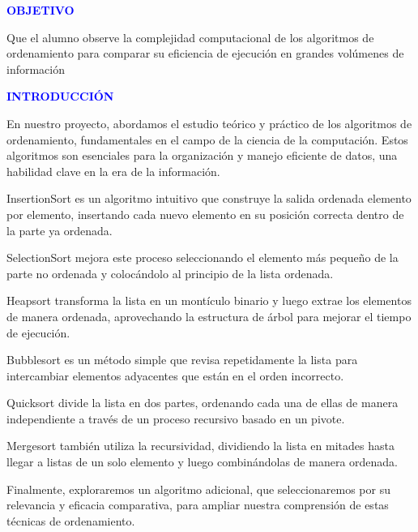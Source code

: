 \documentclass[12pt]{article}
\begin{document}
    \newpage
    \textcolor{blue}{\textbf{OBJETIVO}}
    \par\vspace{0.4cm}
    Que el alumno observe la complejidad computacional de los algoritmos de ordenamiento para 
    comparar su eficiencia de ejecución en grandes volúmenes de información
    \par\vspace{1.5cm}
    \textcolor{blue}{\textbf{INTRODUCCIÓN}}
    \par\vspace{0.4cm}
    En nuestro proyecto, abordamos el estudio teórico y práctico de los algoritmos de ordenamiento, fundamentales en el campo de la ciencia de la computación. Estos algoritmos son esenciales para la organización y manejo eficiente de datos, una habilidad clave en la era de la información.
    \par\vspace{0.4cm}
    InsertionSort es un algoritmo intuitivo que construye la salida ordenada elemento por elemento, insertando cada nuevo elemento en su posición correcta dentro de la parte ya ordenada.
    \par\vspace{0.4cm}
    SelectionSort mejora este proceso seleccionando el elemento más pequeño de la parte no ordenada y colocándolo al principio de la lista ordenada.
    \par\vspace{0.4cm}
    Heapsort transforma la lista en un montículo binario y luego extrae los elementos de manera ordenada, aprovechando la estructura de árbol para mejorar el tiempo de ejecución.
    \par\vspace{0.4cm}
    Bubblesort es un método simple que revisa repetidamente la lista para intercambiar elementos adyacentes que están en el orden incorrecto.
    \par\vspace{0.4cm}
    Quicksort divide la lista en dos partes, ordenando cada una de ellas de manera independiente a través de un proceso recursivo basado en un pivote.
    \par\vspace{0.4cm}
    Mergesort también utiliza la recursividad, dividiendo la lista en mitades hasta llegar a listas de un solo elemento y luego combinándolas de manera ordenada.
    \par\vspace{0.4cm}
    Finalmente, exploraremos un algoritmo adicional, que seleccionaremos por su relevancia y eficacia comparativa, para ampliar nuestra comprensión de estas técnicas de ordenamiento.
\end{document}
